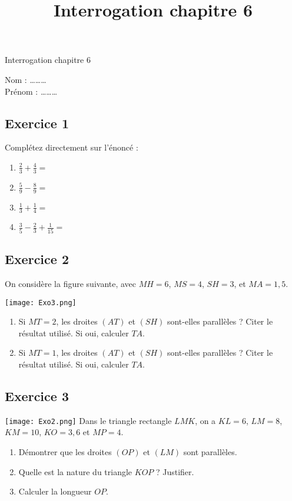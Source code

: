 \documentclass[14 pt]{extarticle}
\title{Interrogation chapitre 6}
\date{}
\theoremstyle{plain}
\begin{document}
\begin{center}{\Large Interrogation chapitre 6}\\ 
 \end{center}
 Nom : \ldots\ldots\ldots\\
 Prénom : \ldots\ldots\ldots
 
 \subsection*{Exercice 1}
 Complétez directement sur l'énoncé : 
 
 \begin{enumerate}
 \item $\frac23 + \frac43 =  $ 
 \item $\frac59 - \frac89=  $ 
 \item $\frac13 + \frac14 =  $
 \item $\frac35 - \frac23 +  \frac1{15} =  $
 \end{enumerate}
 
\subsection*{Exercice 2} 
 
On considère la figure suivante, avec $MH = 6$, $MS= 4$, $SH = 3$, et $MA = 1,5$. 

 \texttt{[image: Exo3.png]}\newline
\begin{enumerate}
\item Si $MT= 2$, les droites $(AT)$ et $(SH)$ sont-elles parallèles ?
Citer le résultat utilisé. Si oui, calculer $TA$. 
\item Si $MT= 1$, les droites $(AT)$ et $(SH)$ sont-elles parallèles ?
Citer le résultat utilisé. Si oui, calculer $TA$.  
\end{enumerate}
 
 \subsection*{Exercice 3}
 
 \texttt{[image: Exo2.png]}\newline
Dans le triangle rectangle $LMK$, on a $KL = 6$, $LM= 8$, $KM=10$, $KO= 3,6$ et $MP= 4$. \begin{enumerate}
\item 
 Démontrer que les droites $(OP)$ et $(LM)$ sont parallèles.
 \item Quelle est la nature du triangle $KOP$ ? Justifier.
 \item 
 Calculer la longueur $OP$. 
\end{enumerate}
\end{document}
